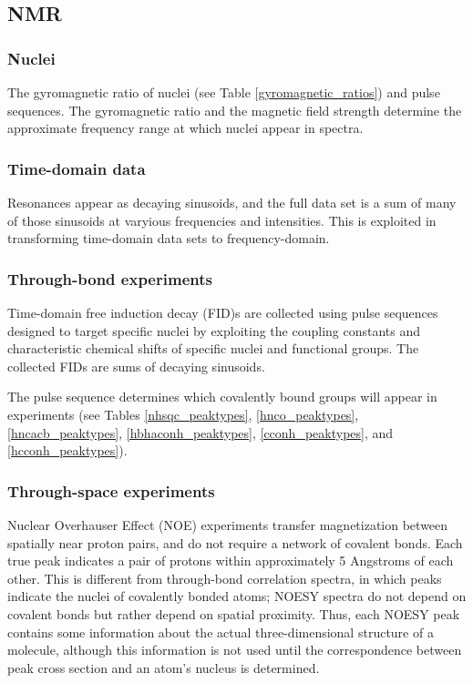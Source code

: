 \subsection*{NMR}

\subsubsection{Nuclei}
The gyromagnetic ratio of nuclei (see Table \ref{gyromagnetic_ratios}) and 
pulse sequences.  The gyromagnetic ratio and the magnetic field strength 
determine the approximate frequency range at which nuclei appear in spectra.

\subsubsection{Time-domain data}
Resonances appear as decaying sinusoids, and the full data set is a sum of
many of those sinusoids at varyious frequencies and intensities.
This is exploited in transforming time-domain data sets to frequency-domain.

\subsubsection{Through-bond experiments}
Time-domain free induction decay (FID)s are collected using
pulse sequences \cite{khaneja2005} designed to target specific nuclei by
exploiting the coupling constants and characteristic chemical shifts of specific 
nuclei and functional groups.  The collected FIDs are sums of decaying sinusoids.

The pulse sequence determines which covalently bound groups will appear in 
experiments (see Tables \ref{nhsqc_peaktypes}, \ref{hnco_peaktypes}, 
\ref{hncacb_peaktypes}, \ref{hbhaconh_peaktypes}, \ref{cconh_peaktypes}, and
\ref{hcconh_peaktypes}).

\subsubsection{Through-space experiments}
Nuclear Overhauser Effect (NOE) \cite{noe_kaiser} experiments transfer 
magnetization between spatially near proton pairs, and do not require a 
network of covalent bonds.  Each true peak indicates a pair of protons within 
approximately 5 Angstroms of each other.  This is different from 
through-bond correlation spectra, in which peaks indicate the nuclei of covalently 
bonded atoms; NOESY spectra do not depend on covalent bonds but rather 
depend on spatial proximity.  Thus, each NOESY peak contains some information 
about the actual three-dimensional structure of a molecule, although this
information is not used until the correspondence between peak cross
section and an atom's nucleus is determined.

